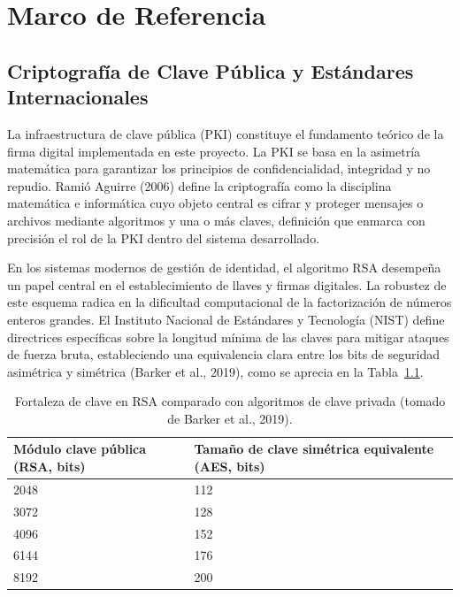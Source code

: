 \documentclass[10pt,letterpaper]{report}
\begin{document}
\chapter{Marco de Referencia}

\section{Criptografía de Clave Pública y Estándares Internacionales}

La infraestructura de clave pública (PKI) constituye el fundamento teórico de la firma digital implementada en este proyecto. La PKI se basa en la asimetría matemática para garantizar los principios de confidencialidad, integridad y no repudio. Ramió Aguirre (2006) define la criptografía como la disciplina matemática e informática cuyo objeto central es cifrar y proteger mensajes o archivos mediante algoritmos y una o más claves, definición que enmarca con precisión el rol de la PKI dentro del sistema desarrollado.

En los sistemas modernos de gestión de identidad, el algoritmo RSA desempeña un papel central en el establecimiento de llaves y firmas digitales. La robustez de este esquema radica en la dificultad computacional de la factorización de números enteros grandes. El Instituto Nacional de Estándares y Tecnología (NIST) define directrices específicas sobre la longitud mínima de las claves para mitigar ataques de fuerza bruta, estableciendo una equivalencia clara entre los bits de seguridad asimétrica y simétrica (Barker et al., 2019), como se aprecia en la Tabla~\ref{tab:rsa-equivalencia}.

\begin{table}[H]
\centering
\caption{Fortaleza de clave en RSA comparado con algoritmos de clave privada (tomado de Barker et al., 2019).}
\label{tab:rsa-equivalencia}
\begin{tabular}{p{} p{}}
\toprule
\textbf{Módulo clave pública (RSA, bits)} & \textbf{Tamaño de clave simétrica equivalente (AES, bits)} \\
\midrule
2048 & 112 \\
3072 & 128 \\
4096 & 152 \\
6144 & 176 \\
8192 & 200 \\
\bottomrule
\end{tabular}
\end{table}
\end{document}
